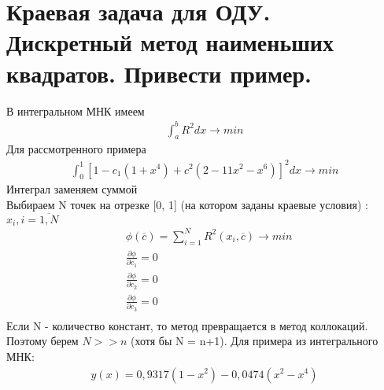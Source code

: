\documentclass[12pt,a4paper]{article}
\begin{document}
	\section{Краевая задача для ОДУ. Дискретный метод наименьших квадратов. Привести пример.}
	В интегральном МНК имеем 
	\begin{align*}
	\int_{a}^{b} R^2 dx \rightarrow min
	\end{align*}
	Для рассмотренного примера 
	\begin{align*}
	\int_{0}^{1} \left[1 - c_1(1+x^4) + c^2(2 - 11x^2 -x^6)\right]^2 dx \rightarrow min
	\end{align*}
	Интеграл заменяем суммой\\
	Выбираем N точек на отрезке [0, 1] (на котором заданы краевые условия) : $x_i, i=\overline{1, N}$\\
	\begin{align*}
	&\phi(\overline{c}) = \sum_{i=1}^{N}R^2(x_i, \overline{c}) \rightarrow min\\
	&\frac{\partial\phi}{\partial c_1} = 0\\
	&\frac{\partial\phi}{\partial c_2} = 0\\
	&\frac{\partial\phi}{\partial c_3} = 0\\
	\end{align*}
	Если N - количество констант, то метод превращается в метод коллокаций. Поэтому берем $N >> n$ (хотя бы N = n+1). Для примера из интегрального МНК:\\
	\begin{align*}
	y(x) = 0,9317(1-x^2) - 0,0474(x^2-x^4)
	\end{align*}
	
\end{document}
